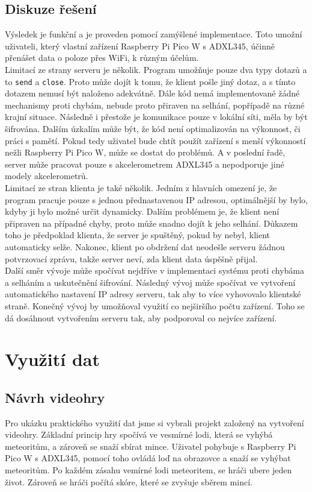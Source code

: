 \documentclass[12pt]{report}			%
\begin{document}
\subsection{Diskuze řešení}
Výsledek je funkční a je proveden pomocí zamýšlené implementace. Toto umožní uživateli, který vlastní zařízení Raspberry Pi Pico W s ADXL345, účinně přenášet data o poloze přes WiFi, k různým účelům. 
\\
Limitací ze strany serveru je několik.
 Program umožňuje pouze dva typy dotazů a to \texttt{send} a \texttt{close}. Proto může dojít k tomu, že klient pošle jiný dotaz, a s tímto dotazem nemusí být naloženo adekvátně. Dále kód nemá implementované žádné mechanismy proti chybám, nebude proto přiraven na selhání, popřípadě na různé krajní situace. Následně i přestože je komunikace pouze v lokální síti, měla by být šifrována. Dalším úzkalím může být, že kód není optimalizován na výkonnost, či práci s pamětí. Pokud tedy uživatel bude chtít použít zařízení s menší výkonností nežli Raspberry Pi Pico W, může se dostat do problémů. A v poslední řadě, server může pracovat pouze s akcelerometrem ADXL345 a nepodporuje jiné modely akcelerometrů.
\\
Limitací ze stran klienta je také několik. Jedním z hlavních omezení je, že program pracuje pouze s jednou přednastavenou IP adresou, optimálnější by bylo, kdyby ji bylo možné určit dynamicky. Dalším problémem je, že klient není připraven na případné chyby, proto může snadno dojít k jeho selhání. Důkazem toho je předpoklad klienta, že server je spuštěný, pokud by nebyl, klient automaticky selže. Nakonec, klient po obdržení dat neodešle serveru žádnou potvrzovací zprávu, takže server neví, zda klient data úspěšně přijal. 
\\
Další směr vývoje může spočívat nejdříve v implementaci systému proti chybáma a selháním a uskutečnění šifrování. Následný vývoj může spočívat ve vytvoření automatického nastavení IP adresy serveru, tak aby to  více vyhovovalo klientské straně. Konečný vývoj by umožňoval využití co nejširšího počtu zařízení. Toho se dá dosáhnout vytvořením serveru tak, aby podporoval co nejvíce zařízení. 

\section{Využití dat}
\subsection{Návrh videohry}
Pro ukázku praktického využití dat jsme si vybrali projekt založený na vytvoření videohry. Základní princip hry spočívá ve vesmírné lodi, která se vyhýbá meteoritům, a zároveň se snaží sbírat mince. Uživatel pohybuje s Raspberry Pi Pico W s ADXL345, pomocí toho ovládá loď na obrazovce a snaží se vyhýbat meteoritům. Po každém zásahu vemírné lodi meteoritem, se hráči ubere jeden život. Zároveň se hráči počítá skóre, které se zvyšuje sběrem mincí.
 
\end{document}
